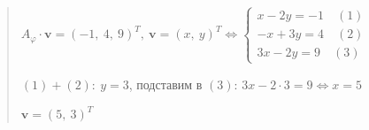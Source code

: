 \documentclass{article}
\begin{document}
\begin{quote}
$A_{\varphi} \cdot \textbf{v} = (-1, \ 4, \ 9)^T, \ \textbf{v} = (x, \ y)^T \Longleftrightarrow 
\begin{cases}
x - 2y = -1 \quad (1)\\
-x + 3y = 4 \quad (2)\\
3x -2y = 9 \quad (3)
\end{cases}
$ 

$(1) + (2): \ y = 3$, подставим в $(3)$: $3x - 2 \cdot 3 = 9 \Leftrightarrow x = 5$

$\textbf{v} = (5, \ 3)^T$

\end{quote}
\end{document}
